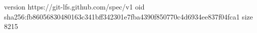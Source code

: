 version https://git-lfs.github.com/spec/v1
oid sha256:fb86056830480163c341bff342301e7fba4390f850770c4d6934ee837f04fca1
size 8215
